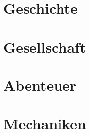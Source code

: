 \documentclass[a4paper,12pt,%
headsepline,%
numbers=noenddot,%
]{scrreprt}
\begin{document}
\part{Geschichte}


\part{Gesellschaft}







\part{Abenteuer}




\part{Mechaniken}





\end{document}
